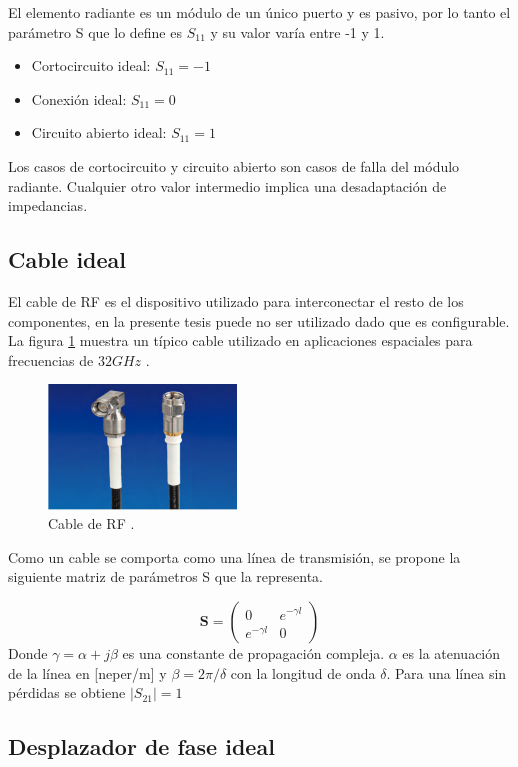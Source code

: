 El elemento radiante es un módulo de un único puerto y es pasivo, por lo tanto el parámetro S que lo define es $S_{11}$ y su
valor varía entre -1 y 1.

\begin{itemize}
	\item Cortocircuito ideal: $S_{11} = -1$
	\item Conexión ideal: $S_{11} = 0$
	\item Circuito abierto ideal: $S_{11} = 1$
\end{itemize}

Los casos de cortocircuito y circuito abierto son casos de falla del módulo radiante. Cualquier otro valor intermedio implica
una desadaptación de impedancias.

\subsection{Cable ideal}
El cable de RF es el dispositivo utilizado para interconectar el resto de los componentes, en la presente tesis puede no ser 
utilizado dado que es configurable. La figura \ref{fig:cableRF} muestra un típico cable utilizado en aplicaciones espaciales 
para frecuencias de $32GHz$ \cite{Gore2013}.

\begin{figure}[H]
 \centering
 \includegraphics[width=5cm]{gfx/cableRF.png}
 \caption{Cable de RF \cite{Gore2013}.}
 \label{fig:cableRF}
\end{figure}

Como un cable se comporta como una línea de transmisión, se propone la siguiente matriz de parámetros S que la 
representa.

$$
\mathbf{S} = \begin{pmatrix} 0 & e^{-\gamma l}\\e^{-\gamma l} & 0\end{pmatrix}
$$
Donde $\gamma = \alpha + j\beta$ es una constante de propagación compleja. $\alpha$ es la atenuación de la línea en [neper/m]
y $\beta = 2\pi/\delta$ con la longitud de onda $\delta$. Para una línea sin pérdidas se obtiene $|S_{21}| = 1$

\subsection{Desplazador de fase ideal}

